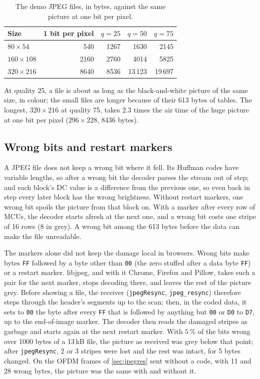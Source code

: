\documentclass[11pt,a4paper]{article}
\newcommand{\code}[1]{\texttt{#1}}
\theoremstyle{remark}
\begin{document}
\begin{table}[ht]
\centering
\caption{The demo JPEG files, in bytes, against the same picture at one bit per pixel.}
\label{tab:jpegsize}
\begin{tabular}{lrrrr}
\toprule
Size & 1 bit per pixel & $q = 25$ & $q = 50$ & $q = 75$\\
\midrule
$80 \times 54$ & 540 & 1267 & 1630 & 2145\\
$160 \times 108$ & 2160 & 2760 & 4014 & 5825\\
$320 \times 216$ & 8640 & 8536 & 13\,123 & 19\,697\\
\bottomrule
\end{tabular}
\end{table}

At quality 25, a file is about as long as the black-and-white picture of the same size, in colour; the small files are longer because of their 613 bytes of tables.
The longest, $320 \times 216$ at quality 75, takes $2.3$ times the air time of the huge picture at one bit per pixel ($296 \times 228$, 8436 bytes).

\subsection{Wrong bits and restart markers}
\label{sec:jpegrst}
A JPEG file does not keep a wrong bit where it fell. Its Huffman codes have variable lengths, so after a wrong bit the decoder parses the stream out of step; and each block's DC value is a difference from the previous one, so even back in step every later block has the wrong brightness.
Without restart markers, one wrong bit spoils the picture from that block on. With a marker after every row of MCUs, the decoder starts afresh at the next one, and a wrong bit costs one stripe of 16 rows (8 in grey). A wrong bit among the 613 bytes before the data can make the file unreadable.

The markers alone did not keep the damage local in browsers.
Wrong bits make bytes \code{FF} followed by a byte other than \code{00} (the zero stuffed after a data byte \code{FF}) or a restart marker. libjpeg, and with it Chrome, Firefox and Pillow, takes such a pair for the next marker, stops decoding there, and leaves the rest of the picture grey.
Before showing a file, the receiver (\code{jpegResync}, \code{jpeg\_resync}) therefore steps through the header's segments up to the scan; then, in the coded data, it sets to \code{00} the byte after every \code{FF} that is followed by anything but \code{00} or \code{D0} to \code{D7}, up to the end-of-image marker.
The decoder then reads the damaged stripes as garbage and starts again at the next restart marker.
With $5\,\%$ of the bits wrong over 1000 bytes of a 13\,kB file, the picture as received was grey below that point; after \code{jpegResync}, 2 or 3 stripes were lost and the rest was intact, for 5 bytes changed.
On the OFDM frames of \cref{sec:jpegres} sent without a code, with 11 and 28 wrong bytes, the picture was the same with and without it.
\end{document}
